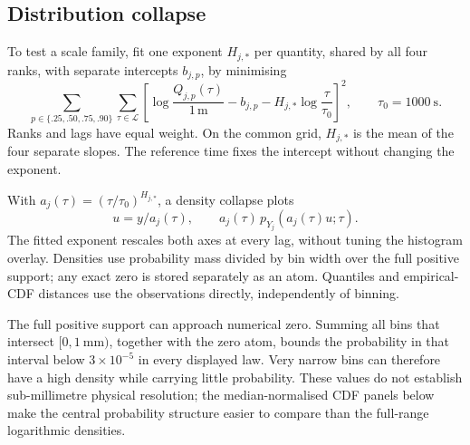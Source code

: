 \subsection{Distribution collapse}
To test a scale family, fit one exponent $H_{j,*}$ per quantity, shared by all
four ranks, with separate intercepts $b_{j,p}$, by minimising
\begin{equation}
 \sum_{p\in\{.25,.50,.75,.90\}}\sum_{\tau\in\mathcal L}
 \left[\log\!\frac{Q_{j,p}(\tau)}{1\,\mathrm m}
       -b_{j,p}-H_{j,*}\log\!\frac{\tau}{\tau_0}\right]^2,
 \qquad \tau_0=\SI{1000}{\second}.
 \label{eq:common-quantile-fit}
\end{equation}
Ranks and lags have equal weight. On the common grid, $H_{j,*}$ is the mean
of the four separate slopes. The reference time fixes the intercept without
changing the exponent.

With $a_j(\tau)=(\tau/\tau_0)^{H_{j,*}}$, a density collapse plots
\begin{equation}
 u=y/a_j(\tau),\qquad a_j(\tau)\,p_{Y_j}(a_j(\tau)u;\tau).
 \label{eq:measured-density-collapse}
\end{equation}
The fitted exponent rescales both axes at every lag, without tuning the histogram
overlay. Densities use probability mass divided by bin width over the full positive
support; any exact zero is stored separately as an atom. Quantiles and empirical-CDF
distances use the observations directly, independently of binning.

The full positive support can approach numerical zero. Summing all bins that
intersect $[0,\SI{1}{\milli\metre})$, together with the zero atom, bounds the
probability in that interval below $3\times10^{-5}$ in every displayed law.
Very narrow bins can therefore have a high density while carrying little
probability. These values do not establish sub-millimetre physical resolution;
the median-normalised CDF panels below make the central probability structure
easier to compare than the full-range logarithmic densities.

